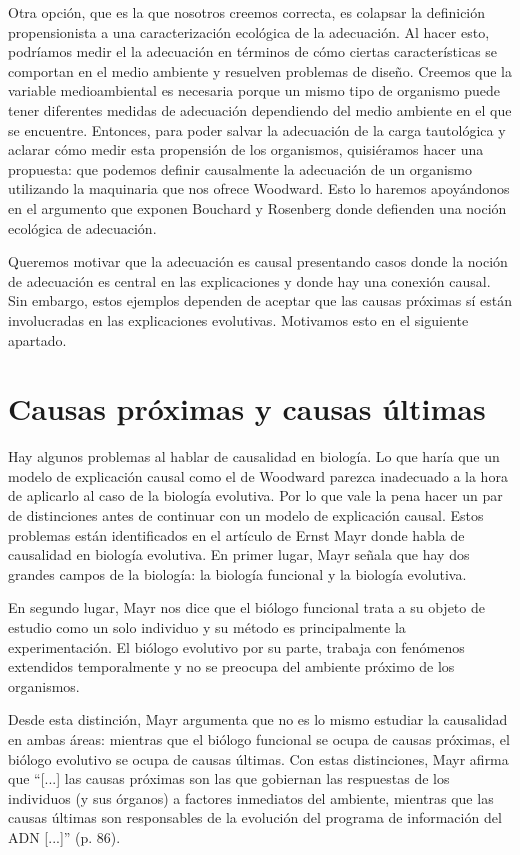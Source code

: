 Otra opción, que es la que nosotros creemos correcta, es colapsar la definición propensionista a una caracterización ecológica de la adecuación. Al hacer esto, podríamos medir el la adecuación en términos de cómo ciertas características se comportan en el medio ambiente y resuelven problemas de diseño. Creemos que la variable medioambiental es necesaria porque un mismo tipo de organismo puede tener diferentes medidas de adecuación dependiendo del medio ambiente en el que se encuentre. Entonces, para poder salvar la adecuación de la carga tautológica y aclarar cómo medir esta propensión de los organismos, quisiéramos hacer una propuesta: que podemos definir causalmente la adecuación de un organismo utilizando la maquinaria que nos ofrece Woodward. Esto lo haremos apoyándonos en el argumento que exponen Bouchard y Rosenberg \citeyear{Bouchard2004} donde defienden una noción ecológica de adecuación.

Queremos motivar que la adecuación es causal presentando casos donde la noción de adecuación es central en las explicaciones y donde hay una conexión causal. Sin embargo, estos ejemplos dependen de aceptar que las causas próximas sí están involucradas en las explicaciones evolutivas. Motivamos esto en el siguiente apartado.

\section{Causas próximas y causas últimas}


Hay algunos problemas al hablar de causalidad en biología. Lo que haría que un modelo de explicación causal como el de Woodward parezca inadecuado a la hora de aplicarlo al caso de la biología evolutiva. Por lo que vale la pena hacer un par de distinciones antes de continuar con un modelo de explicación causal. Estos problemas están identificados en el artículo de Ernst Mayr \citeyear{Mayr1998} donde habla de causalidad en biología evolutiva. En primer lugar, Mayr señala que hay dos grandes campos de la biología: la biología funcional y la biología evolutiva.

En segundo lugar, Mayr nos dice que el biólogo funcional trata a su objeto de estudio como un solo individuo y su método es principalmente la experimentación. El biólogo evolutivo por su parte, trabaja con fenómenos extendidos temporalmente y no se preocupa del ambiente próximo de los organismos.

Desde esta distinción, Mayr argumenta que no es lo mismo estudiar la causalidad en ambas áreas: mientras que el biólogo funcional se ocupa de causas próximas, el biólogo evolutivo se ocupa de causas últimas. Con estas distinciones, Mayr afirma que ``[...] las causas próximas son las que gobiernan las respuestas de los individuos (y sus órganos) a factores inmediatos del ambiente, mientras que las causas últimas son responsables de la evolución del programa de información del ADN [...]'' (p. 86).

